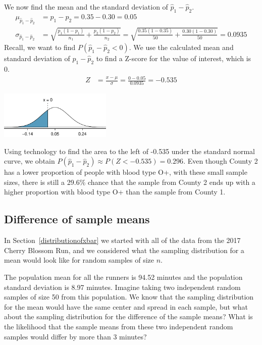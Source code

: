 \begin{examplewrap}
\begin{nexample}
We now find the mean and the standard deviation of $\hat{p}_1-\hat{p}_2$.  
\begin{align*}
\mu_{\hat{p}_1-\hat{p}_2} &= p_1-p_2 = 0.35 - 0.30 = 0.05 \\
\sigma_{\hat{p}_1-\hat{p}_2}
  &= \sqrt{\frac{p_1(1-p_1)}{n_1} + \frac{p_2(1-p_2)}{n_2}}
  =\sqrt{\frac{0.35(1-0.35)}{50} + \frac{0.30(1-0.30)}{50}}
  = 0.0935
\end{align*}
Recall, we want to find $P(\hat{p}_1-\hat{p}_2<0)$.  We use the calculated mean and standard deviation of $\hat{p}_1-\hat{p}_2$ to find a Z-score for the value of interest, which is 0.
\begin{align*}
Z &= \frac{x - \mu}{\sigma} = \frac{0 - 0.05}{0.0935}=-0.535
\end{align*}
\begin{center}
\includegraphics[width=0.4\textwidth]{ch_distributions/figures/bloodtypeOpos/bloodtypeOposMeanComparison}
\end{center}
Using technology to find the area to the left of -0.535 under the standard normal curve, we obtain $P(\hat{p}_1-\hat{p}_2) \approx P(Z < -0.535) = 0.296$.  Even though County 2 has a lower proportion of people with blood type O+, with these small sample sizes, there is still a 29.6\% chance that the sample from County 2 ends up with a higher proportion with blood type O+  than the sample from County 1.
\end{nexample}
\end{examplewrap}


\D{\newpage}

\subsection{Difference of sample means}
In Section~\ref{distributionofxbar} we started with all of the data from the 2017 Cherry Blossom Run, and we considered what the sampling distribution for a mean would look like for random samples of size $n$.

The population mean for all the runners is 94.52 minutes and the population standard deviation is 8.97 minutes.
Imagine taking two independent random samples of size 50 from this population.
We know that the sampling distribution for the mean would have the same center and spread in each sample, but what about the sampling distribution for the difference of the sample means?
What is the likelihood that the sample means from these two independent random samples would differ by more than 3 minutes?

